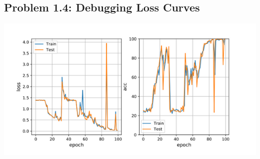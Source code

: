 \documentclass{article}
\begin{document}
\subsection*{Problem 1.4: Debugging Loss Curves}
%
\includegraphics[width=14cm]{"loss.png"}
\end{document}
